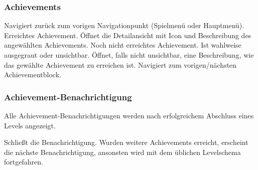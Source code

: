 \subsubsection{Achievements}
\begin{requirements}
 Navigiert zurück zum vorigen Navigationpunkt (Spielmenü oder Hauptmenü).
 Erreichtes Achievement. Öffnet die Detailansicht mit Icon und Beschreibung des angewählten Achievements.
 Noch nicht erreichtes Achievement. Ist wahlweise ausgegraut oder unsichtbar. Öffnet, falls nicht unsichtbar, eine Beschreibung, wie das gewählte Achievement zu erreichen ist.
 Navigiert zum vorigen/nächsten Achievementblock.
\end{requirements}

\begin{center}
\setlength\fboxsep{20pt}
\setlength\fboxrule{1pt}
\end{center}

\subsubsection{Achievement-Benachrichtigung}
Alle Achievement-Benachrichtigungen werden nach erfolgreichem Abschluss eines Levels angezeigt.
\begin{requirements}
 Schließt die Benachrichtigung. Wurden weitere Achievements erreicht, erscheint die nächste Benachrichtigung, ansonsten wird mit dem üblichen Levelschema fortgefahren. 
\end{requirements} 

